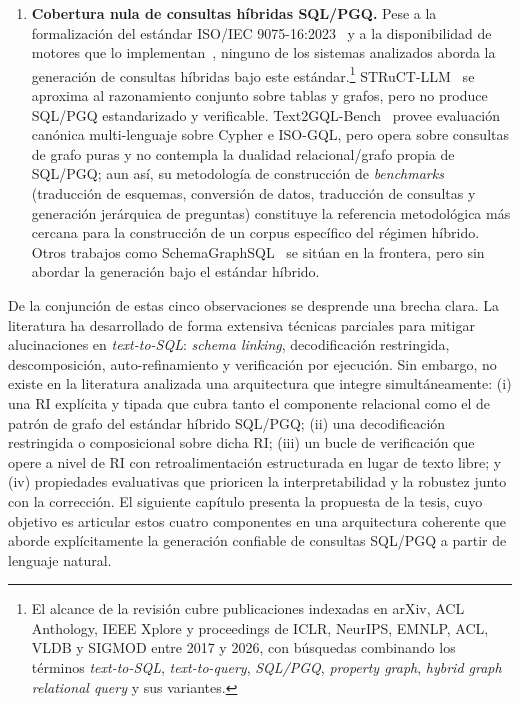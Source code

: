 \begin{enumerate}
    \item \textbf{Cobertura nula de consultas híbridas
    \ac{SQL}/\ac{PGQ}.} Pese a la formalización del estándar
    ISO/IEC 9075-16:2023~\cite{ISO9075_16_2023} y a la disponibilidad
    de motores que lo implementan~\cite{DuckPGQ}, ninguno de los
    sistemas analizados aborda la generación de consultas híbridas
    bajo este estándar.\footnote{El alcance de la revisión cubre
    publicaciones indexadas en arXiv, ACL Anthology, IEEE Xplore y
    proceedings de ICLR, NeurIPS, EMNLP, ACL, VLDB y SIGMOD entre
    2017 y 2026, con búsquedas combinando los términos
    \emph{text-to-SQL}, \emph{text-to-query}, \emph{SQL/PGQ},
    \emph{property graph}, \emph{hybrid graph relational query} y sus
    variantes.} STRuCT-LLM~\cite{STRuCT-LLM2025} se aproxima al
    razonamiento conjunto sobre tablas y grafos, pero no produce
    \ac{SQL}/\ac{PGQ} estandarizado y verificable.
    Text2GQL-Bench~\cite{text2gqlbench} provee evaluación canónica
    multi-lenguaje sobre Cypher e ISO-GQL, pero opera sobre consultas
    de grafo puras y no contempla la dualidad relacional/grafo propia
    de \ac{SQL}/\ac{PGQ}; aun así, su metodología de construcción de
    \emph{benchmarks} (traducción de esquemas, conversión de datos,
    traducción de consultas y generación jerárquica de preguntas)
    constituye la referencia metodológica más cercana para la
    construcción de un corpus específico del régimen híbrido. Otros
    trabajos como SchemaGraphSQL~\cite{SchemaGraphSQL} se sitúan en
    la frontera, pero sin abordar la generación bajo el estándar
    híbrido.
\end{enumerate}

De la conjunción de estas cinco observaciones se desprende una brecha
clara. La literatura ha desarrollado de forma extensiva técnicas
parciales para mitigar alucinaciones en \emph{text-to-SQL}: \emph{schema
linking}, decodificación restringida, descomposición, auto-refinamiento
y verificación por ejecución. Sin embargo, no existe en la literatura
analizada una arquitectura que integre simultáneamente: (i) una RI
explícita y tipada que cubra tanto el componente relacional como el de
patrón de grafo del estándar híbrido \ac{SQL}/\ac{PGQ}; (ii) una
decodificación restringida o composicional sobre dicha RI; (iii) un
bucle de verificación que opere a nivel de RI con retroalimentación
estructurada en lugar de texto libre; y (iv) propiedades evaluativas
que prioricen la interpretabilidad y la robustez junto con la
corrección. El siguiente capítulo presenta la propuesta de la tesis,
cuyo objetivo es articular estos cuatro componentes en una arquitectura %
coherente que aborde explícitamente la generación confiable de
consultas \ac{SQL}/\ac{PGQ} a partir de lenguaje natural.

